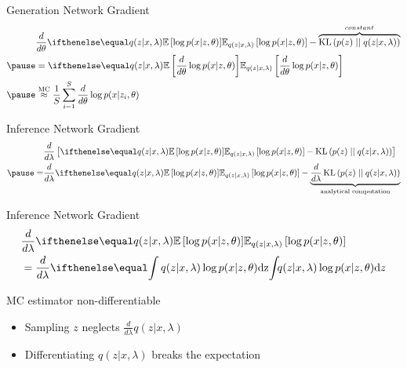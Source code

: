 \documentclass[14pt]{beamer}
\begin{document}
\begin{frame}{Generation Network Gradient}
\begin{equation*}
\begin{aligned}
&\frac{d}{d\theta}\E[q(z|x,\lambda)]{\log p(x|z,\theta)} - \overbrace{\KL{p(z)}{q(z|x,\lambda)}}^{constant} \\ \pause 
&=\E[q(z|x,\lambda)]{\frac{d}{d\theta}\log p(x|z,\theta)} \\ \pause
&\overset{\text{MC}}{\approx} \frac{1}{S}\sum_{i=1}^{S}
\frac{d}{d\theta} \log p(x|z_{i},\theta)
\end{aligned}
\end{equation*}
\pause
{}
\end{frame}

\begin{frame}{Inference Network Gradient}
\begin{equation*}
\begin{aligned}
&\frac{d}{d\lambda}\left[\E[q(z|x,\lambda)]{\log p(x|z,\theta)} - \KL{p(z)}{q(z|x,\lambda)} \right] \\ \pause
=&\frac{d}{d\lambda}\E[q(z|x,\lambda)]{\log p(x|z,\theta)} - \underbrace{\frac{d}{d\lambda}\KL{p(z)}{q(z|x,\lambda)}}_{\text{analytical computation}} \\
\end{aligned}
\end{equation*}
\pause
{}
\end{frame}

\begin{frame}{Inference Network Gradient}
\begin{align*}
&\frac{d}{d\lambda}\E[q(z|x,\lambda)]{\log p(x|z,\theta)} \\
&= \frac{d}{d\lambda} \intl{q(z|x,\lambda)\log p(x|z,\theta)}{z}
\end{align*}
\pause
\begin{block}{MC estimator non-differentiable}
\begin{itemize}
\pause
\item Sampling $ z $ neglects $ \frac{d}{d\lambda} q(z|x,\lambda) $
\pause
\item Differentiating $ q(z|x,\lambda) $ breaks the expectation
\end{itemize}
\end{block}
\end{frame}
\end{document}
